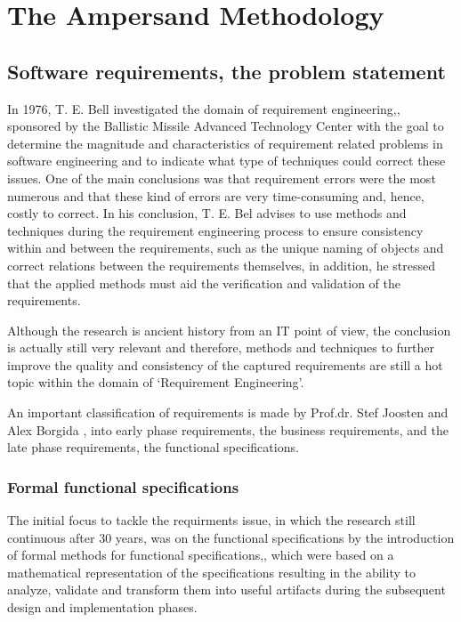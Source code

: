 
\section{The Ampersand Methodology}
\label{sec:AmpersandTheory}

\subsection{Software requirements, the problem statement}

In 1976,  T. E. Bell investigated the domain of requirement engineering,, sponsored by the Ballistic Missile Advanced Technology Center with the goal to determine the magnitude and characteristics of requirement related problems in software engineering and to indicate what type of techniques could correct these issues. 
One of the main conclusions was that requirement errors were the most numerous and that these kind of errors are very time-consuming and, hence, costly to correct.
In his conclusion,  T. E. Bel advises to use methods and techniques during the requirement engineering process to ensure consistency within and  between the requirements, such as the unique naming of objects and correct relations between the requirements themselves, in addition, he stressed that the applied methods must aid the verification and validation of the requirements.
 
Although the research is ancient history from an IT point of view, the conclusion is actually still very relevant and therefore, methods and techniques to further improve the quality and consistency of the captured requirements are still a hot topic within the domain of `Requirement Engineering'.

An important classification of requirements is made by  Prof.dr. Stef Joosten  and Alex Borgida , into early phase requirements, the business requirements, and the late phase requirements, the functional specifications. 

\subsubsection{Formal functional specifications}
The initial focus to tackle the requirments issue, in which the research still continuous after 30 years, was on the functional specifications by the introduction of formal methods for functional specifications,, which were based on a mathematical representation of the specifications resulting in the ability to analyze, validate and transform them into useful artifacts during the subsequent design and implementation phases. 

